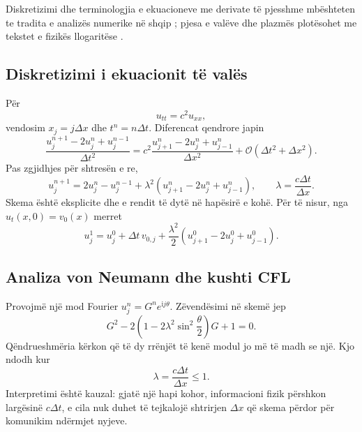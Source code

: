 \documentclass[11pt,oneside,openany]{book}
\newcommand{\Oh}{\mathcal{O}}
\begin{document}
Diskretizimi dhe terminologjia e ekuacioneve me derivate të pjesshme mbështeten te tradita e analizës numerike në shqip \cite{hoxha,hanelli,naco}; pjesa e valëve dhe plazmës plotësohet me tekstet e fizikës llogaritëse \cite{giordano,landau}.



\subsection{Diskretizimi i ekuacionit të valës}
Për
\begin{equation}
 u_{tt}=c^2u_{xx},
\end{equation}
vendosim $x_j=j\Delta x$ dhe $t^n=n\Delta t$. Diferencat qendrore japin
\begin{equation}
 \frac{u_j^{n+1}-2u_j^n+u_j^{n-1}}{\Delta t^2}
 =c^2\frac{u_{j+1}^n-2u_j^n+u_{j-1}^n}{\Delta x^2}
 +\Oh(\Delta t^2+\Delta x^2).
\end{equation}
Pas zgjidhjes për shtresën e re,
\begin{equation}
 u_j^{n+1}=2u_j^n-u_j^{n-1}
 +\lambda^2(u_{j+1}^n-2u_j^n+u_{j-1}^n),
 \qquad \lambda=\frac{c\Delta t}{\Delta x}.
\end{equation}
Skema është eksplicite dhe e rendit të dytë në hapësirë e kohë. Për të nisur, nga $u_t(x,0)=v_0(x)$ merret
\begin{equation}
 u_j^1=u_j^0+\Delta t\,v_{0,j}
 +\frac{\lambda^2}{2}(u_{j+1}^0-2u_j^0+u_{j-1}^0).
\end{equation}

\subsection{Analiza von Neumann dhe kushti CFL}
Provojmë një mod Fourier $u_j^n=G^ne^{\mathrm{i}j\theta}$. Zëvendësimi në skemë jep
\begin{equation}
 G^2-2\left(1-2\lambda^2\sin^2\frac\theta2\right)G+1=0.
\end{equation}
Qëndrueshmëria kërkon që të dy rrënjët të kenë modul jo më të madh se një. Kjo ndodh kur
\begin{equation}
 \lambda=\frac{c\Delta t}{\Delta x}\le1.
\end{equation}
Interpretimi është kauzal: gjatë një hapi kohor, informacioni fizik përshkon largësinë $c\Delta t$, e cila nuk duhet të tejkalojë shtrirjen $\Delta x$ që skema përdor për komunikim ndërmjet nyjeve.
\end{document}
